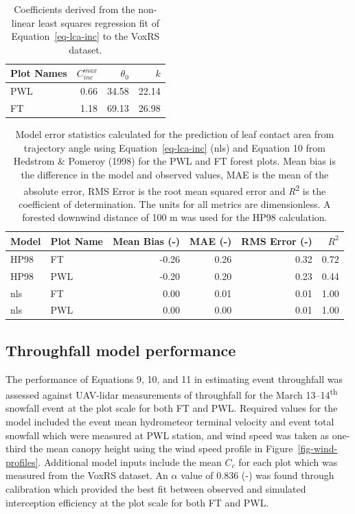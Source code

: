 \documentclass[
  letterpaper,
  DIV=11,
  numbers=noendperiod]{scrartcl}
\begin{document}
\begin{longtable}[]{@{}lrrr@{}}

\caption{\label{tbl-lca-coefs}Coefficients derived from the non-linear
least squares regression fit of Equation~\ref{eq-lca-inc} to the VoxRS
dataset.}

\tabularnewline

\toprule\noalign{}
Plot Names & \(C^{max}_{inc}\) & \(\theta_0\) & \(k\) \\
\midrule\noalign{}
\endhead
\bottomrule\noalign{}
\endlastfoot
PWL & 0.66 & 34.58 & 22.14 \\
FT & 1.18 & 69.13 & 26.98 \\

\end{longtable}

\begin{longtable}[]{@{}llrrrr@{}}

\caption{\label{tbl-lca-mod-err}Model error statistics calculated for
the prediction of leaf contact area from trajectory angle using
Equation~\ref{eq-lca-inc} (nls) and Equation 10 from Hedstrom \& Pomeroy
(1998) for the PWL and FT forest plots. Mean bias is the difference in
the model and observed values, MAE is the mean of the absolute error,
RMS Error is the root mean squared error and \emph{R}\textsuperscript{2}
is the coefficient of determination. The units for all metrics are
dimensionless. A forested downwind distance of 100 m was used for the
HP98 calculation.}

\tabularnewline

\toprule\noalign{}
Model & Plot Name & Mean Bias (-) & MAE (-) & RMS Error (-) & \(R^2\) \\
\midrule\noalign{}
\endhead
\bottomrule\noalign{}
\endlastfoot
HP98 & FT & -0.26 & 0.26 & 0.32 & 0.72 \\
HP98 & PWL & -0.20 & 0.20 & 0.23 & 0.44 \\
nls & FT & 0.00 & 0.01 & 0.01 & 1.00 \\
nls & PWL & 0.00 & 0.00 & 0.01 & 1.00 \\

\end{longtable}

\subsection{Throughfall model
performance}\label{throughfall-model-performance}

The performance of Equations 9, 10, and 11 in estimating event
throughfall was assessed against UAV-lidar measurements of throughfall
for the March 13--14\textsuperscript{th} snowfall event at the plot
scale for both FT and PWL. Required values for the model included the
event mean hydrometeor terminal velocity and event total snowfall which
were measured at PWL station, and wind speed was taken as one-third the
mean canopy height using the wind speed profile in
Figure~\ref{fig-wind-profiles}. Additional model inputs include the mean
\(C_c\) for each plot which was measured from the VoxRS dataset. An
\(\alpha\) value of 0.836 (-) was found through calibration which
provided the best fit between observed and simulated interception
efficiency at the plot scale for both FT and PWL.
\end{document}
